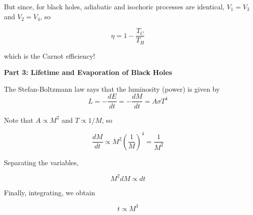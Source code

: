 \documentclass[11pt]{article}
\begin{document}
\begin{pproblem}
\begin{pssolution*}{}{}
\begin{alternativas}
            But since, for black holes, adiabatic and isochoric processes are identical, \(V_1=V_3\) and \(V_2=V_4\), so

            \[\boxed{\eta = 1 -\frac{T_C}{T_H}}\]

            which is the Carnot efficiency!

            \begin{center}
                \textbf{Part 3: Lifetime and Evaporation of Black Holes}
            \end{center}
        \end{alternativas}
        \begin{alternativas}
            \item The Stefan-Boltzmann law says that the luminosity (power) is given by
            \[L = -\frac{dE}{dt} = - \frac{dM}{dt} = A\sigma T^4 \]

            Note that \(A\propto M^2\) and \(T\propto 1/M\), so

            \[\frac{dM}{dt} \propto M^2\left(\frac{1}{M}\right)^4 = \frac{1}{M^2}\]

            Separating the variables,

            \[M^2dM \propto dt\]

            Finally, integrating, we obtain

            \[\boxed{t \propto M^3}\]
        \end{alternativas}
    \end{pssolution*}


\end{pproblem}
\end{document}
